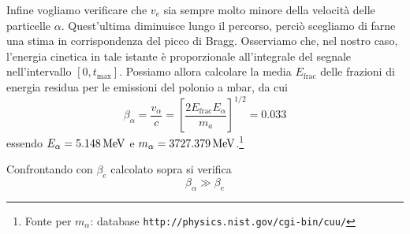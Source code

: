 \documentclass[italian,a4paper]{article}
\renewcommand{\a}{\alpha}
\begin{document}
Infine vogliamo verificare che $v_e$ sia sempre molto minore della velocit\`a delle particelle $\a$. Quest'ultima diminuisce lungo il percorso, perci\`o scegliamo di farne una stima in corrispondenza del picco di Bragg.
Osserviamo che, nel nostro caso, l'energia cinetica in tale istante \`e proporzionale all'integrale del segnale nell'intervallo $[0, t_{\max}]$. Possiamo allora calcolare la media $E_{\text{frac}}$ delle frazioni di energia residua per le emissioni del polonio a \unit[600]{mbar}, da cui
\begin{equation*}
\beta_\a = \frac{v_\a}{c} = \left[ \frac{2 E_{\text{frac}} E_\a}{m_a} \right]^{1/2} = 0.033
\end{equation*}
essendo $E_\a=\unit[5.148]{MeV}$ e $m_\a=\unit[3727.379]{MeV}$.\footnote{Fonte per $m_\a$: database \texttt{http://physics.nist.gov/cgi-bin/cuu/}}

Confrontando con $\beta_e$ calcolato sopra si verifica
\begin{equation*}
\beta_\a \gg \beta_e
\end{equation*}
\end{document}
